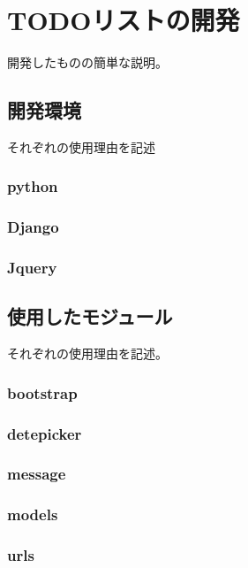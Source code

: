 \chapter{TODOリストの開発}
\label{cha:Development}
開発したものの簡単な説明。

\section{開発環境}
それぞれの使用理由を記述

\subsection{python}

\subsection{Django}

\subsection{Jquery}

\section{使用したモジュール}
それぞれの使用理由を記述。
\subsection{bootstrap}

\subsection{detepicker}

\subsection{message}

\subsection{models}

\subsection{urls}